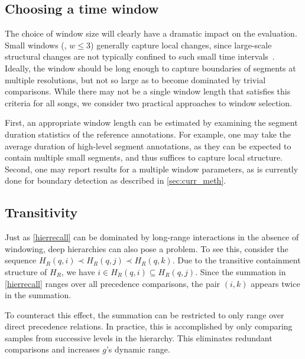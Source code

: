 \documentclass{article}
\begin{document}
\subsection{Choosing a time window}

The choice of window size will clearly have a dramatic impact on the evaluation.
Small windows (\eg, $w \leq 3$) generally capture local changes, since large-scale structural changes are not typically confined to such small time intervals~\cite{Smith2013}.
Ideally, the window should be long enough to capture boundaries of segments at multiple resolutions, but not so large as to become dominated by trivial comparisons.
While there may not be a single window length that satisfies this criteria for all songs, we consider two practical approaches to window selection.

First, an appropriate window length can be estimated by examining the segment duration statistics of the reference annotations.  
For example, one may take the average duration of high-level segment annotations, as they can be expected to contain multiple small segments, and thus suffices to capture local structure.
Second, one may report results for a multiple window parameters, as is currently done for boundary detection as described in \cref{sec:curr_meth}.  



\subsection{Transitivity}

Just as \cref{hierrecall} can be dominated by long-range interactions in the absence of windowing, deep hierarchies can also pose a problem.
To see this, consider the sequence $H_R(q, i) \prec H_R(q, j) \prec H_R(q, k)$.
Due to the transitive containment structure of $H_R$, we have $i \in H_R(q, i) \subseteq H_R(q, j)$.
Since the summation in \cref{hierrecall} ranges over all precedence comparisons, the pair $(i, k)$ appears twice in the summation.

To counteract this effect, the summation can be restricted to only range over direct precedence relations.
In practice, this is accomplished by only comparing samples from successive levels in the hierarchy.
This eliminates redundant comparisons and increases $g$'s dynamic range.
\end{document}
